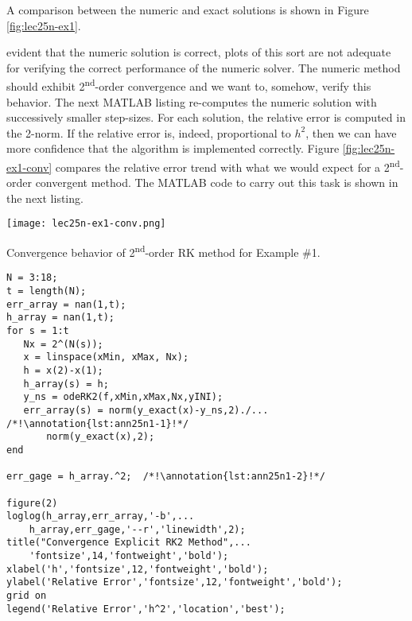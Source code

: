 \noindent A comparison between the numeric and exact solutions is shown in Figure \ref{fig:lec25n-ex1}. 

 evident that the numeric solution is correct, plots of this sort are not adequate for verifying the correct performance of the numeric solver.  The numeric method should exhibit 2\textsuperscript{nd}-order convergence and we want to, somehow, verify this behavior.  The next MATLAB listing re-computes the numeric solution with successively smaller step-sizes.  For each solution, the relative error is computed in the 2-norm.  If the relative error is, indeed, proportional to $h^2$, then we can have more confidence that the algorithm is implemented correctly.  Figure \ref{fig:lec25n-ex1-conv} compares the relative error trend with what we would expect for a 2\textsuperscript{nd}-order convergent method.  The MATLAB code to carry out this task is shown in the next listing.
\begin{marginfigure}
\texttt{[image: lec25n-ex1-conv.png]}
\caption{Convergence behavior of 2\textsuperscript{nd}-order RK method for Example \#1.}
\label{fig:lec25n-ex1-conv}
\end{marginfigure}
\setcounter{lstannotation}{0}
\begin{lstlisting}[style=myMatlab,name=lec25n-2]
%% Convergence Test
N = 3:18;
t = length(N);
err_array = nan(1,t);
h_array = nan(1,t);
for s = 1:t
   Nx = 2^(N(s));
   x = linspace(xMin, xMax, Nx);
   h = x(2)-x(1);
   h_array(s) = h;
   y_ns = odeRK2(f,xMin,xMax,Nx,yINI);
   err_array(s) = norm(y_exact(x)-y_ns,2)./... /*!\annotation{lst:ann25n1-1}!*/
       norm(y_exact(x),2);
end

err_gage = h_array.^2;  /*!\annotation{lst:ann25n1-2}!*/

figure(2)
loglog(h_array,err_array,'-b',...
    h_array,err_gage,'--r','linewidth',2);
title("Convergence Explicit RK2 Method",...
    'fontsize',14,'fontweight','bold');
xlabel('h','fontsize',12,'fontweight','bold');
ylabel('Relative Error','fontsize',12,'fontweight','bold');
grid on
legend('Relative Error','h^2','location','best');
\end{lstlisting}

